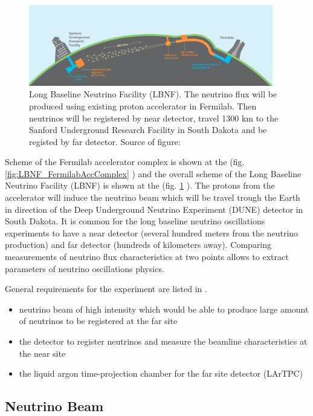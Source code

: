 \begin{figure}
\caption{Long Baseline Neutrino Facility (LBNF). The neutrino flux will be produced using existing proton accelerator in Fermilab. Then neutrinos will be registered by near detector, travel 1300 km to the Sanford Underground Research Facility in South Dakota and be registed by far detector. Source of figure: \cite{ref_LBNFweb} }
\label{fig:LBNF_overallScheme}
\centering
\includegraphics[width=0.95\textwidth, keepaspectratio=true]{figs/LBNF_overallScheme.png} 
\end{figure}

Scheme of the Fermilab accelerator complex is shown at the (fig. \ref{fig:LBNF_FermilabAccComplex} ) and the overall scheme of the 
Long Baseline Neutrino Facility (LBNF) is shown at the (fig. \ref{fig:LBNF_overallScheme} ). The protons from the accelerator  will induce the neutrino beam which will be travel trough the Earth in direction of the Deep Underground Neutrino Experiment (DUNE) detector in South Dakota. It is common for the long baseline neutrino oscillations experiments to have a near detector (several hundred meters from the neutrino production) and far detector (hundreds of kilometers away). Comparing measurements of neutrino flux characteristics at two points allows to extract parameters of neutrino oscillations physics.

General requirements for the experiment are listed in \cite{ref_LBNFdoc_volume-detectors}.
\begin{itemize}
  \item neutrino beam of high intensity which would be able to produce large amount of neutrinos to be registered at the far site
  \item the detector to register neutrinos and measure the beamline characteristics at the near site
  \item the liquid argon time-projection chamber for the far site detector (LArTPC)
\end{itemize}

\subsection{Neutrino Beam}

